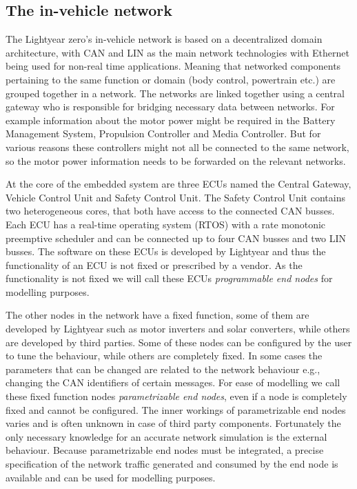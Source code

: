 \subsection{The in-vehicle network}
The Lightyear zero's in-vehicle network is based on a decentralized domain architecture, with CAN and LIN as the main network technologies with Ethernet being used for non-real time applications. Meaning that networked components pertaining to the same function or domain (body control, powertrain etc.) are grouped together in a network. The networks are linked together using a central gateway who is responsible for bridging necessary data between networks. For example information about the motor power might be required in the Battery Management System, Propulsion Controller and Media Controller. But for various reasons these controllers might not all be connected to the same network, so the motor power information needs to be forwarded on the relevant networks. 

At the core of the embedded system are three ECUs named the Central Gateway, Vehicle Control Unit and Safety Control Unit. The Safety Control Unit contains two heterogeneous cores, that both have access to the connected CAN busses. Each ECU has a real-time operating system (RTOS) with a rate monotonic preemptive scheduler and can be connected up to four CAN busses and two LIN busses. The software on these ECUs is developed by Lightyear and thus the functionality of an ECU is not fixed or prescribed by a vendor. As the functionality is not fixed we will call these ECUs \textit{programmable end nodes} for modelling purposes. 

The other nodes in the network have a fixed function, some of them are developed by Lightyear such as motor inverters and solar converters, while others are developed by third parties. Some of these nodes can be configured by the user to tune the behaviour, while others are completely fixed. In some cases the parameters that can be changed are related to the network behaviour e.g., changing the CAN identifiers of certain messages. For ease of modelling we call these fixed function nodes \textit{parametrizable end nodes}, even if a node is completely fixed and cannot be configured. The inner workings of parametrizable end nodes varies and is often unknown in case of third party components. Fortunately the only necessary knowledge for an accurate network simulation is the external behaviour. Because parametrizable end nodes must be integrated, a precise specification of the network traffic generated and consumed by the end node is available and can be used for modelling purposes. 

